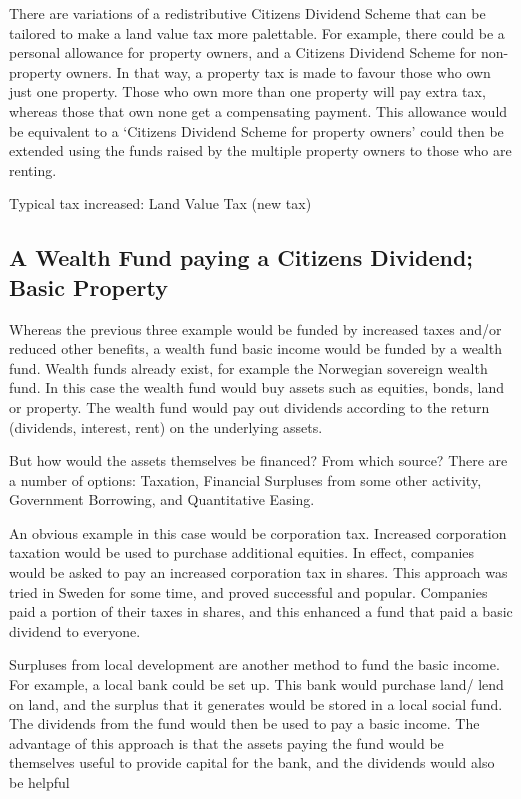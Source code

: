 \documentclass[]{tufte-handout}
\begin{document}
There are variations of a redistributive Citizens Dividend Scheme that
can be tailored to make a land value tax more palettable. For example,
there could be a personal allowance for property owners, and a Citizens
Dividend Scheme for non-property owners. In that way, a property tax is
made to favour those who own just one property. Those who own more than
one property will pay extra tax, whereas those that own none get a
compensating payment. This allowance would be equivalent to a `Citizens
Dividend Scheme for property owners' could then be extended using the
funds raised by the multiple property owners to those who are renting.

Typical tax increased: Land Value Tax (new tax)

\hypertarget{a-wealth-fund-paying-a-citizens-dividend-basic-property}{%
\subsection{A Wealth Fund paying a Citizens Dividend; Basic
Property}\label{a-wealth-fund-paying-a-citizens-dividend-basic-property}}

Whereas the previous three example would be funded by increased taxes
and/or reduced other benefits, a wealth fund basic income would be
funded by a wealth fund. Wealth funds already exist, for example the
Norwegian sovereign wealth fund. In this case the wealth fund would buy
assets such as equities, bonds, land or property. The wealth fund would
pay out dividends according to the return (dividends, interest, rent) on
the underlying assets.

But how would the assets themselves be financed? From which source?
There are a number of options: Taxation, Financial Surpluses from some
other activity, Government Borrowing, and Quantitative Easing.

An obvious example in this case would be corporation tax. Increased
corporation taxation would be used to purchase additional equities. In
effect, companies would be asked to pay an increased corporation tax in
shares. This approach was tried in Sweden for some time, and proved
successful and popular. Companies paid a portion of their taxes in
shares, and this enhanced a fund that paid a basic dividend to everyone.

Surpluses from local development are another method to fund the basic
income. For example, a local bank could be set up. This bank would
purchase land/ lend on land, and the surplus that it generates would be
stored in a local social fund. The dividends from the fund would then be
used to pay a basic income. The advantage of this approach is that the
assets paying the fund would be themselves useful to provide capital for
the bank, and the dividends would also be helpful
\end{document}
